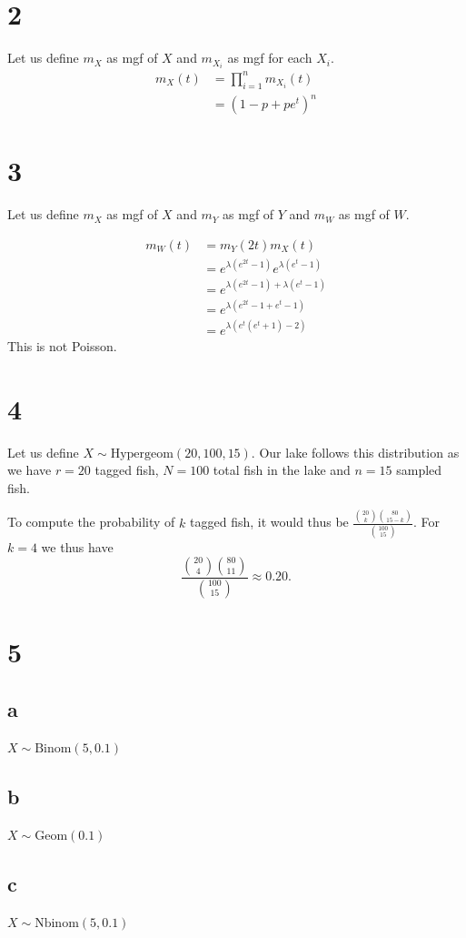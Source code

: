 \documentclass[10pt]{article}
\begin{document}
\section*{2}
Let us define $m_X$ as mgf of $X$ and $m_{X_i}$ as mgf for each $X_i.$
\begin{align*}
    m_X(t) &= \prod_{i=1}^nm_{X_i}(t)\\
    &= (1-p+pe^t)^n
\end{align*}

\section*{3}
Let us define $m_X$ as mgf of $X$ and $m_Y$ as mgf of $Y$ and $m_W$ as mgf of $W.$

\begin{align*}
    m_W(t) &= m_Y(2t)m_X(t)\\
    &=e^{\lambda(e^{2t}-1)}e^{\lambda(e^t-1)}\\
    &=e^{\lambda(e^{2t}-1) + \lambda(e^t-1)}\\
    &=e^{\lambda(e^{2t}-1+e^t-1)}\\
    &=e^{\lambda(e^t(e^t+1)-2)}
\end{align*}
This is not Poisson.

\section*{4}

Let us define $X \sim \text{Hypergeom}(20,100, 15).$ Our lake follows this distribution as we have $r=20$ tagged fish, $N=100$ total fish in the lake and $n=15$ sampled fish.

To compute the probability of $k$ tagged fish, it would thus be $\frac{\binom{20}{k}\binom{80}{15-k}}{\binom{100}{15}}$. For $k=4$ we thus have
\[ \frac{\binom{20}{4}\binom{80}{11}}{\binom{100}{15}}\approx0.20.\]

\section*{5}
\subsection*{a}
$X\sim\text{Binom}(5,0.1)$
\subsection*{b}
$X\sim\text{Geom}(0.1)$
\subsection*{c}
$X\sim\text{Nbinom}(5, 0.1)$
\end{document}
